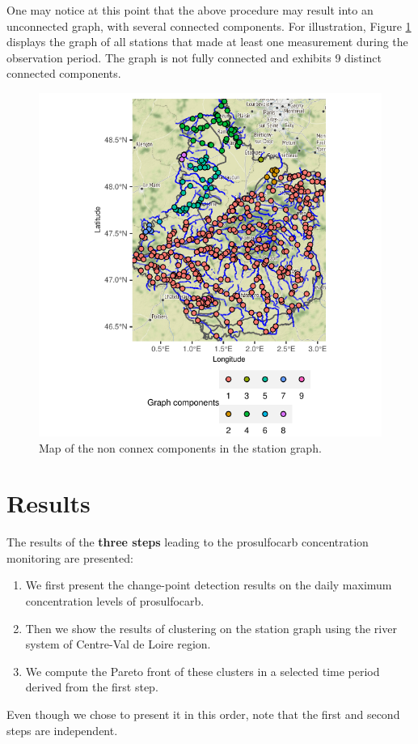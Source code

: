 One may notice at this point that the above procedure may result into an unconnected graph, with several connected components. For illustration, Figure \ref{fig:comp} displays the graph of all stations that made at least one measurement during the observation period. The graph is not fully connected and exhibits 9 distinct connected components.  

\begin{figure}[htbp]
  \centering
  \includegraphics[]{figs/Chap5/Graph_comp-1.pdf}
  \caption{Map of the non connex components in the station graph.}
  \label{fig:comp}
\end{figure}

\section{Results}\label{section:results}

The results of the \textbf{three steps} leading to the prosulfocarb concentration monitoring are presented: 
\begin{enumerate}
\item We first present the change-point detection results on the daily maximum concentration levels of prosulfocarb.
\item Then we show the results of clustering on the station graph using the river system of Centre-Val de Loire region. 
\item We compute the Pareto front of these clusters in a selected time period derived from the first step. 
\end{enumerate}
Even though we chose to present it in this order, note that the first and second steps are independent.  

